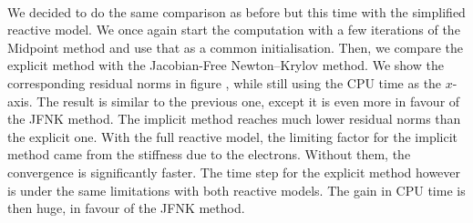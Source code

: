         \paragraph{}
        We decided to do the same comparison as before but this time with the simplified reactive model.
        We once again start the computation with a few iterations of the Midpoint method and use that as a common initialisation.
        Then, we compare the explicit method with the Jacobian-Free Newton--Krylov method.
        We show the corresponding residual norms in figure , while still using the CPU time as the $x$-axis.
        The result is similar to the previous one, except it is even more in favour of the JFNK method.
        The implicit method reaches much lower residual norms than the explicit one.
        With the full reactive model, the limiting factor for the implicit method came from the stiffness due to the electrons.
        Without them, the convergence is significantly faster.
        The time step for the explicit method however is under the same limitations with both reactive models.
        The gain in CPU time is then huge, in favour of the JFNK method.
